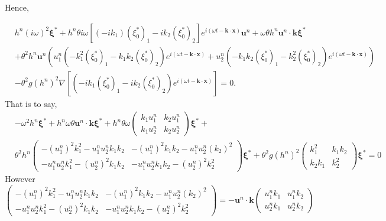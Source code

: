 \documentclass[a4paper, 11pt]{report}
\begin{document}
Hence,

\begin{equation*}
\begin{split}
&h^n(i\omega)^2\boldsymbol{\xi}^*+h^n\theta i\omega\left[(-ik_1)(\xi_0^*)_1-ik_2(\xi_0^*)_2\right]e^{i(\omega t-\boldsymbol{k}\cdot \boldsymbol{x})}\boldsymbol{u}^n+\omega\theta h^n\boldsymbol{u}^n\cdot \boldsymbol{k}\boldsymbol{\xi}^*\\
&+\theta^2 h^n\boldsymbol{u}^n\left(u_1^n\left(-k_1^2(\xi_0^*)_1-k_1k_2(\xi_0^*)_2\right)e^{i(\omega t-\boldsymbol{k}\cdot \boldsymbol{x})}+u_2^n\left(-k_1k_2(\xi_0^*)_1-k_2^2(\xi_0^*)_2\right)e^{i(\omega t-\boldsymbol{k}\cdot \boldsymbol{x})}\right)\\
&-\theta^2g(h^n)^2\nabla\left[(-ik_1(\xi_0^*)_1-ik_2(\xi_0^*)_2)e^{i(\omega t-\boldsymbol{k}\cdot \boldsymbol{x})}\right]=0.
\end{split}
\end{equation*}
That is to say, 
\begin{equation*}
\begin{split}
&-\omega^2h^n\boldsymbol{\xi}^*+h^n\omega \theta\boldsymbol{u}^n\cdot \boldsymbol{k}\boldsymbol{\xi}^*+h^n\theta\omega \begin{pmatrix}k_1u_1^n&k_2u_1^n\\k_1u_2^n&k_2u_2^n\end{pmatrix}\boldsymbol{\xi}^*+\\
&\theta^2 h^n\begin{pmatrix}-(u_1^n)^2k_1^2-u_1^nu_2^nk_1k_2&-(u_1^n)^2k_1k_2-u_1^nu_2^n(k_2)^2\\
-u_1^nu_2^nk_1^2-(u_2^n)^2k_1k_2&-u_1^nu_2^nk_1k_2-(u_2^n)^2k_2^2\end{pmatrix}\boldsymbol{\xi}^*+\theta^2g(h^n)^2\begin{pmatrix}k_1^2&k_1k_2\\k_2k_1&k_2^2\end{pmatrix}\boldsymbol{\xi}^*=0
\end{split}
\end{equation*}
However
\begin{equation*}
\begin{pmatrix}-(u_1^n)^2k_1^2-u_1^nu_2^nk_1k_2&-(u_1^n)^2k_1k_2-u_1^nu_2^n(k_2)^2\\
-u_1^nu_2^nk_1^2-(u_2^n)^2k_1k_2&-u_1^nu_2^nk_1k_2-(u_2^n)^2k_2^2\end{pmatrix}
=-\boldsymbol{u}^n\cdot \boldsymbol{k}\begin{pmatrix}u_1^nk_1&u_1^nk_2\\u_2^nk_1&u_2^nk_2\end{pmatrix}
\end{equation*}
\end{document}
